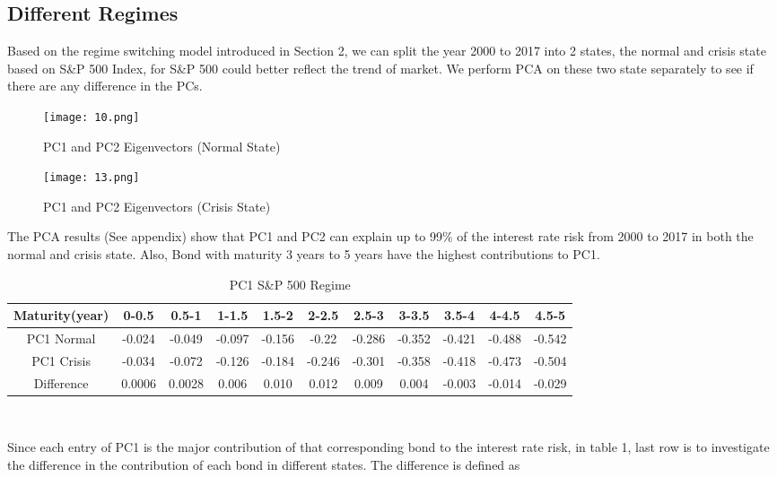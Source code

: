 \documentclass[12pt]{article}
\begin{document}
\subsection{Different Regimes}

Based on the regime switching model introduced in Section 2, we can split the year 2000 to 2017 into 2 states, the normal and crisis state based on S\&P 500 Index, for S\&P 500 could better reflect the trend of market. We perform PCA on these two state separately to see if there are any difference in the PCs. 


\begin{figure}[H]
\centering
\texttt{[image: 10.png]}\\
\caption{PC1 and PC2 Eigenvectors (Normal State)}
\end{figure}


\begin{figure}[H]
\centering
\texttt{[image: 13.png]}\\
\caption{PC1 and PC2 Eigenvectors (Crisis State)}
\end{figure}


The PCA results (See appendix) show that PC1 and PC2 can explain up to 99\% of the interest rate risk from 2000 to 2017 in both the normal and crisis state. Also, Bond with maturity 3 years to 5 years have the highest contributions to PC1.

\begin {table}[H]
\caption {PC1 S\&P 500 Regime} 
\label{tab:title} 
\begin{center}
\begin{tabular} {c|c|c|c|c|c|c|c|c|c|c}
\hline\hline
Maturity(year) &0-0.5 &0.5-1 &1-1.5 &1.5-2 &2-2.5 &2.5-3 &3-3.5 &3.5-4 &4-4.5 &4.5-5 \\
\hline
PC1 Normal &-0.024&-0.049&-0.097&-0.156&-0.22&-0.286&-0.352&-0.421&-0.488&-0.542
\\
\hline
PC1 Crisis &-0.034&-0.072&-0.126&-0.184&-0.246&-0.301&-0.358&-0.418&-0.473&-0.504
\\
\hline
Difference &0.0006&0.0028&0.006&0.010&0.012&0.009&0.004&-0.003&-0.014&-0.029
\\
\hline\hline
\end{tabular}\\
\end{center}
\end {table}

Since each entry of PC1 is the major contribution of that corresponding bond to the interest rate risk, in table 1, last row is to investigate the difference in the contribution of each bond in different states. The difference is defined as
\end{document}
